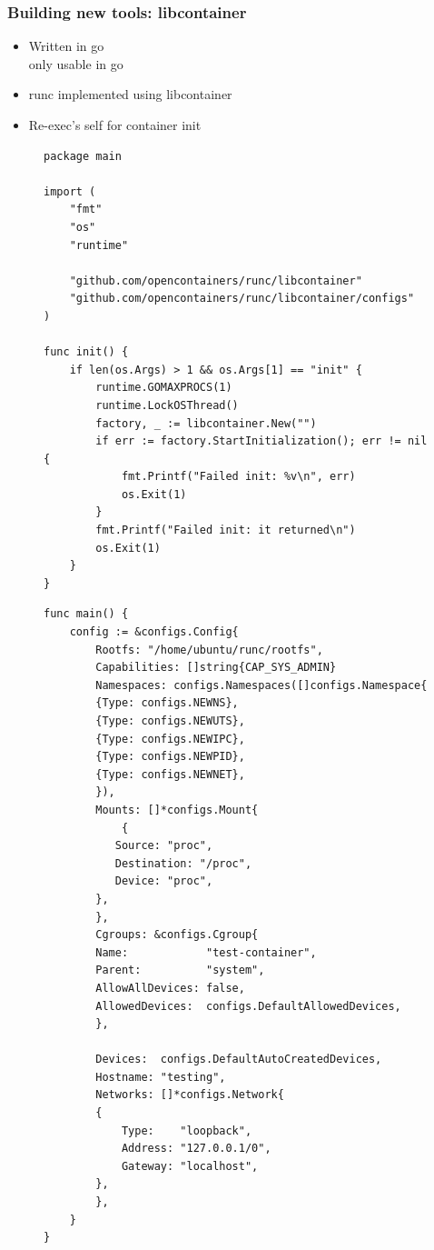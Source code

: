\documentclass{beamer}
\begin{document}
\begin{frame}
\frametitle{Building new tools: libcontainer}
\begin{itemize}
\item Written in go \\
only usable in go
\item runc implemented using libcontainer
\item Re-exec's self for container init
\end{itemize}
\end{frame}

\begin{frame}[fragile]
\begin{figure}
{\tiny
  \begin{lstlisting}
package main

import (
	"fmt"
	"os"
	"runtime"

	"github.com/opencontainers/runc/libcontainer"
	"github.com/opencontainers/runc/libcontainer/configs"
)

func init() {
	if len(os.Args) > 1 && os.Args[1] == "init" {
		runtime.GOMAXPROCS(1)
		runtime.LockOSThread()
		factory, _ := libcontainer.New("")
		if err := factory.StartInitialization(); err != nil {
			fmt.Printf("Failed init: %v\n", err)
			os.Exit(1)
		}
		fmt.Printf("Failed init: it returned\n")
		os.Exit(1)
	}
}
   \end{lstlisting}
}
\end{figure}
\end{frame}

\begin{frame}[fragile]
\begin{figure}
{\tiny
   \begin{lstlisting}
func main() {
	config := &configs.Config{
	    Rootfs: "/home/ubuntu/runc/rootfs",
	    Capabilities: []string{CAP_SYS_ADMIN}
	    Namespaces: configs.Namespaces([]configs.Namespace{
		{Type: configs.NEWNS},
		{Type: configs.NEWUTS},
		{Type: configs.NEWIPC},
		{Type: configs.NEWPID},
		{Type: configs.NEWNET},
	    }),
	    Mounts: []*configs.Mount{
	        {
		   Source: "proc",
		   Destination: "/proc",
		   Device: "proc",
		},
	    },
	    Cgroups: &configs.Cgroup{
		Name:            "test-container",
		Parent:          "system",
		AllowAllDevices: false,
		AllowedDevices:  configs.DefaultAllowedDevices,
	    },

	    Devices:  configs.DefaultAutoCreatedDevices,
	    Hostname: "testing",
	    Networks: []*configs.Network{
		{
		    Type:    "loopback",
		    Address: "127.0.0.1/0",
		    Gateway: "localhost",
		},
	    },
	}
}
   \end{lstlisting}
}
\end{figure}
\end{frame}
\end{document}
